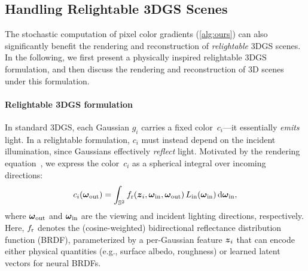 \subsection{Handling Relightable 3DGS Scenes}
\label{ssec:extensions}
%


%
The stochastic computation of pixel color gradients (\autoref{alg:ours}) can also significantly benefit the rendering and reconstruction of \emph{relightable} 3DGS scenes.
In the following, we first present a physically inspired relightable 3DGS formulation, and then discuss the rendering and reconstruction of 3D scenes under this formulation.


\paragraph{Relightable 3DGS formulation}
In standard 3DGS, each Gaussian $g_i$ carries a fixed color~$c_i$---it essentially \emph{emits} light.
In a relightable formulation, $c_i$ must instead depend on the incident illumination, since Gaussians effectively \emph{reflect} light.
Motivated by the rendering equation~\cite{Kajiya:RE}, we express the color~$c_i$ as a spherical integral over incoming directions:
%
\begin{equation}
	\label{Eq:RE}
	c_i(\boldsymbol{\omega}_\mathrm{out}) = \int_{\mathbb{S}^2} f_\mathrm{r}(\boldsymbol{z}_i, \boldsymbol{\omega}_\mathrm{in}, \boldsymbol{\omega}_\mathrm{out}) \,L_\mathrm{in}(\boldsymbol{\omega}_\mathrm{in}) \,\mathrm{d}\boldsymbol{\omega}_\mathrm{in},
\end{equation}
%
where $\boldsymbol{\omega}_\mathrm{out}$ and $\boldsymbol{\omega}_\mathrm{in}$ are the viewing and incident lighting directions, respectively.
Here, $f_\mathrm{r}$ denotes the (cosine-weighted) bidirectional reflectance distribution function (BRDF), parameterized by a per-Gaussian feature $\boldsymbol{z}_i$ that can encode either physical quantities (e.g., surface albedo, roughness) or learned latent vectors for neural BRDFs.

